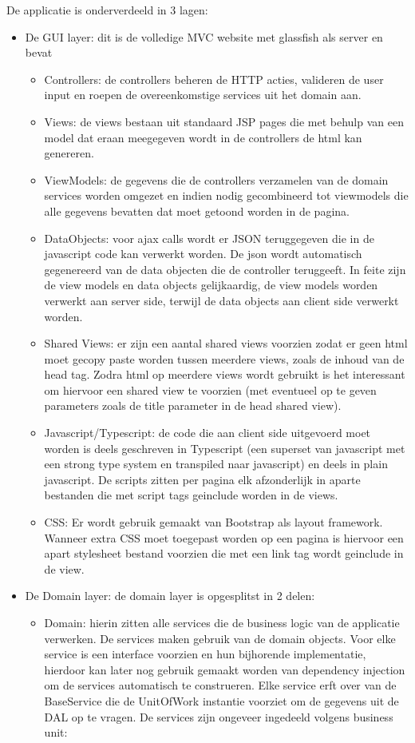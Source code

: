 De applicatie is onderverdeeld in 3 lagen:
\begin{itemize}
\item De GUI layer: dit is de volledige MVC website met glassfish als server en bevat
  \begin{itemize}
  \item Controllers: de controllers beheren de HTTP acties, valideren de user input en roepen de overeenkomstige services uit het domain aan.
  \item Views: de views bestaan uit standaard JSP pages die met behulp van een model dat eraan meegegeven wordt in de controllers de html kan genereren.
  \item ViewModels: de gegevens die de controllers verzamelen van de domain services worden omgezet en indien nodig gecombineerd tot viewmodels die alle gegevens bevatten dat moet getoond worden in de pagina.
  \item DataObjects: voor ajax calls wordt er JSON teruggegeven die in de javascript code kan verwerkt worden. De json wordt automatisch gegenereerd van de data objecten die de controller teruggeeft. In feite zijn de view models en data objects gelijkaardig, de view models worden verwerkt aan server side, terwijl de data objects aan client side verwerkt worden.
  \item Shared Views: er zijn een aantal shared views voorzien zodat er geen html moet gecopy paste worden tussen meerdere views, zoals de inhoud van de head tag. Zodra html op meerdere views wordt gebruikt is het interessant om hiervoor een shared view te voorzien (met eventueel op te geven parameters zoals de title parameter in de head shared view).
  \item Javascript/Typescript: de code die aan client side uitgevoerd moet worden is deels geschreven in Typescript (een superset van javascript met een strong type system en transpiled naar javascript) en deels in plain javascript. De scripts zitten per pagina elk afzonderlijk in aparte bestanden die met script tags geinclude worden in de views.
  \item CSS: Er wordt gebruik gemaakt van Bootstrap als layout framework. Wanneer extra CSS moet toegepast worden op een pagina is hiervoor een apart stylesheet bestand voorzien die met een link tag wordt geinclude in de view.
  \end{itemize}
\item De Domain layer: de domain layer is opgesplitst in 2 delen:
  \begin{itemize}
  \item Domain: hierin zitten alle services die de business logic van de applicatie verwerken. De services maken gebruik van de domain objects. Voor elke service is een interface voorzien en hun bijhorende implementatie, hierdoor kan later nog gebruik gemaakt worden van dependency injection om de services automatisch te construeren. Elke service erft over van de BaseService die de UnitOfWork instantie voorziet om de gegevens uit de DAL op te vragen. De services zijn ongeveer ingedeeld volgens business unit:

\end{itemize}
\end{itemize}
